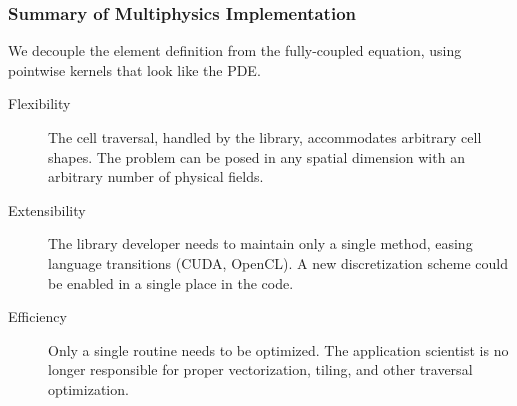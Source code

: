 \documentclass[aspectratio=169,hyperref=colorlinks]{beamer}
\begin{document}
\begin{frame}
  \frametitle{Summary of Multiphysics Implementation}
  \summary{}

  We decouple the element definition from the fully-coupled equation,
  using pointwise kernels that look like the PDE.

  \vfill    
  \begin{description}
  \item[Flexibility] The cell traversal, handled by the library,
    accommodates arbitrary cell shapes. The problem can be posed
    in any spatial dimension with an arbitrary number of
    physical fields.
  \item[Extensibility] The library developer needs to maintain only a
    single method, easing language transitions (CUDA, OpenCL). A new
    discretization scheme could be enabled in a single place in the
    code.
  \item[Efficiency] Only a single routine needs to be
    optimized. The application scientist is no longer
    responsible for proper vectorization, tiling, and other
    traversal optimization.
  \end{description}

\end{frame}


\end{document}
